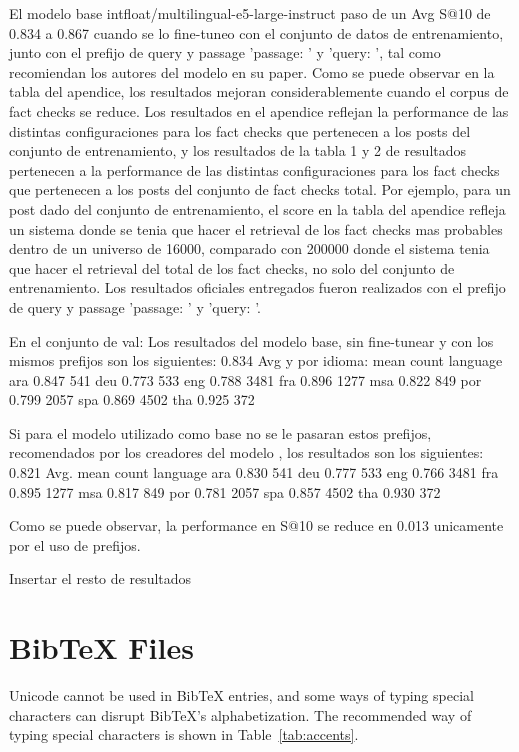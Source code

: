 \documentclass[11pt]{article}
\begin{document}
El modelo base intfloat/multilingual-e5-large-instruct paso de un Avg S@10 de 0.834 a 0.867 cuando se lo fine-tuneo con el conjunto de datos de entrenamiento, junto con el prefijo de query y passage 'passage: ' y 'query: ', tal como recomiendan los autores del modelo en su paper.
Como se puede observar en la tabla del apendice, los resultados mejoran considerablemente cuando el corpus de fact checks se reduce. Los resultados en el apendice reflejan la performance de las distintas configuraciones para los fact checks que pertenecen a los posts del conjunto de entrenamiento, y los resultados de la tabla 1 y 2 de resultados pertenecen a la performance de las distintas configuraciones para los fact checks que pertenecen a los posts del conjunto de fact checks total.
Por ejemplo, para un post dado del conjunto de entrenamiento, el score en la tabla del apendice refleja un sistema donde se tenia que hacer el retrieval de los fact checks mas probables dentro de un universo de 16000, comparado con 200000 donde el sistema tenia que hacer el retrieval del total de los fact checks, no solo del conjunto de entrenamiento.
Los resultados oficiales entregados fueron realizados con el prefijo de query y passage 'passage: ' y 'query: '. 

En el conjunto de val:
Los resultados del modelo base, sin fine-tunear y con los mismos prefijos son los siguientes:
0.834 Avg y por idioma: mean count language ara 0.847 541 deu 0.773 533 eng 0.788 3481 fra 0.896 1277 msa 0.822 849 por 0.799 2057 spa 0.869 4502 tha 0.925 372

Si para el modelo utilizado como base no se le pasaran estos prefijos, recomendados por los creadores del modelo , los resultados son los siguientes:
0.821 Avg. mean count language ara 0.830 541 deu 0.777 533 eng 0.766 3481 fra 0.895 1277 msa 0.817 849 por 0.781 2057 spa 0.857 4502 tha 0.930 372

Como se puede observar, la performance en S@10 se reduce en 0.013 unicamente por el uso de prefijos.

Insertar el resto de resultados

\section{Bib\TeX{} Files}
\label{sec:bibtex}

Unicode cannot be used in Bib\TeX{} entries, and some ways of typing special characters can disrupt Bib\TeX's alphabetization. The recommended way of typing special characters is shown in Table~\ref{tab:accents}.
\end{document}
